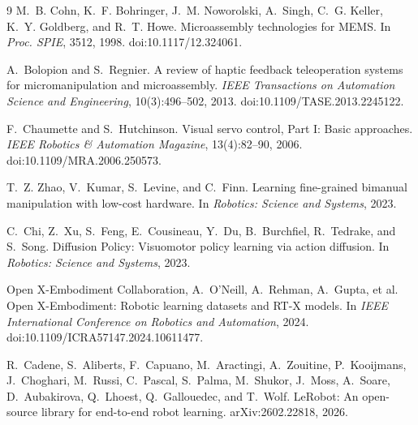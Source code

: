 \documentclass[10pt,twocolumn,letterpaper]{article}
\begin{document}
\begin{thebibliography}{9}
M.~B. Cohn, K.~F. Bohringer, J.~M. Noworolski, A.~Singh, C.~G. Keller,
K.~Y. Goldberg, and R.~T. Howe.
\newblock Microassembly technologies for MEMS.
\newblock In \emph{Proc. SPIE}, 3512, 1998.
\newblock doi:10.1117/12.324061.

A.~Bolopion and S.~Regnier.
\newblock A review of haptic feedback teleoperation systems for
micromanipulation and microassembly.
\newblock \emph{IEEE Transactions on Automation Science and Engineering},
10(3):496--502, 2013.
\newblock doi:10.1109/TASE.2013.2245122.

F.~Chaumette and S.~Hutchinson.
\newblock Visual servo control, Part I: Basic approaches.
\newblock \emph{IEEE Robotics \& Automation Magazine}, 13(4):82--90, 2006.
\newblock doi:10.1109/MRA.2006.250573.

T.~Z. Zhao, V.~Kumar, S.~Levine, and C.~Finn.
\newblock Learning fine-grained bimanual manipulation with low-cost hardware.
\newblock In \emph{Robotics: Science and Systems}, 2023.

C.~Chi, Z.~Xu, S.~Feng, E.~Cousineau, Y.~Du, B.~Burchfiel, R.~Tedrake,
and S.~Song.
\newblock Diffusion Policy: Visuomotor policy learning via action diffusion.
\newblock In \emph{Robotics: Science and Systems}, 2023.

Open X-Embodiment Collaboration, A.~O'Neill, A.~Rehman, A.~Gupta, et al.
\newblock Open X-Embodiment: Robotic learning datasets and RT-X models.
\newblock In \emph{IEEE International Conference on Robotics and Automation},
2024.
\newblock doi:10.1109/ICRA57147.2024.10611477.

R.~Cadene, S.~Aliberts, F.~Capuano, M.~Aractingi, A.~Zouitine,
P.~Kooijmans, J.~Choghari, M.~Russi, C.~Pascal, S.~Palma, M.~Shukor,
J.~Moss, A.~Soare, D.~Aubakirova, Q.~Lhoest, Q.~Gallouedec, and T.~Wolf.
\newblock LeRobot: An open-source library for end-to-end robot learning.
\newblock arXiv:2602.22818, 2026.
\end{thebibliography}
\end{document}
